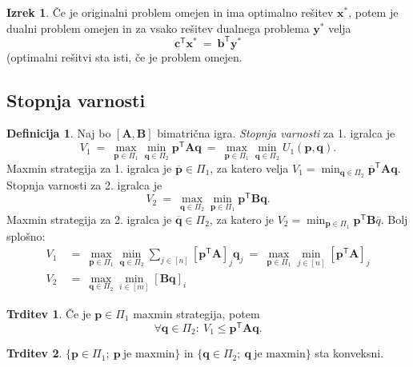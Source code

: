 \documentclass[11pt]{article}
\newcommand{\set}[1]{\{#1\}}
\newcommand{\oglati}[1]{\left[#1\right]}
\newcommand{\T}{\textsf{T}}
\newcommand{\p}{\mathbf{p}}
\newcommand{\q}{\mathbf{q}}
\newcommand{\x}{\mathbf{x}}
\newcommand{\y}{\mathbf{y}}
\renewcommand{\b}{\mathbf{b}}
\renewcommand{\c}{\mathbf{c}}
\renewcommand{\AA}{\mathbf{A}}
\newcommand{\BB}{\mathbf{B}}
\newcommand{\1}{\mathbbm{1}}
\theoremstyle{definition}
\newtheorem{definicija}{Definicija}[section]
\theoremstyle{definition}
\newtheorem{trditev}{Trditev}[section]
\theoremstyle{definition}
\newtheorem{izrek}{Izrek}[section]
\theoremstyle{definition}
\begin{document}
\begin{izrek}

Če je originalni problem omejen in ima optimalno rešitev $\x^*$, potem je dualni problem omejen in za vsako rešitev dualnega problema $\y^*$ velja
$$\c^\T\x^* ~=~ \b^\T\y^*$$
(optimalni rešitvi sta isti, če je problem omejen.

\end{izrek}
\vspace{0.5cm}


\subsection{Stopnja varnosti}
\vspace{0.5cm}

\begin{definicija}

Naj bo $\oglati{\AA,\BB}$ bimatrična igra. \textit{Stopnja varnosti} za 1. igralca je
$$V_1 ~=~ \max_{\p\in\Pi_1}\min_{\q\in\Pi_2} \p^\T\AA\q ~=~ \max_{\p\in\Pi_1}\min_{\q\in\Pi_2} U_1(\p,\q).$$
Maxmin strategija za 1. igralca je $\overline{\p}\in \Pi_1$, za katero velja $V_1 = \min_{\q\in\Pi_2}\overline{\p}^\T\AA\q$. Stopnja varnosti za 2. igralca je
$$V_2 ~=~ \max_{\q\in\Pi_2}\min_{\p\in\Pi_1}\p^\T\BB\q.$$
Maxmin strategija za 2. igralca je $\overline{\q}\in\Pi_2$, za katero je $V_2 = \min_{\p\in\Pi_1}\p^\T\BB\overline{q}$. Bolj splošno:
\begin{align*}
V_1 ~&=~ \max_{\p\in\Pi_1}\min_{\q\in\Pi_2}\sum_{j\in [n]}\oglati{\p^\T\AA}_j \q_j ~=~ \max_{\p\in\Pi_1}\min_{j\in [n]}\oglati{\p^\T\AA}_j \\
V_2 ~&=~ \max_{\q\in\Pi_2}\min_{i\in [m]}\oglati{\BB\q}_i
\end{align*}

\end{definicija}
\vspace{0.5cm}

\begin{trditev}

Če je $\p\in\Pi_1$ maxmin strategija, potem
$$\forall\q\in\Pi_2: ~V_1 \leq \p^\T\AA\q.$$

\end{trditev}
\vspace{0.5cm}

\begin{trditev}

$\set{\p\in\Pi_1; ~\p~\text{je maxmin}}$ in $\set{\q\in\Pi_2; ~\q~\text{je maxmin}}$ sta \hbox{konveksni.}

\end{trditev}
\vspace{0.5cm}
\end{document}
